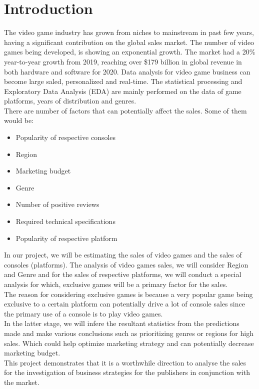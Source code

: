 \documentclass[conference]{IEEEtran}
\begin{document}
\section{Introduction}
The video game industry has grown from niches to mainstream in past few years, having a significant contribution on the global sales market. The number of video games being developed, is showing an exponential growth. The market had a 20\% year-to-year growth from 2019, reaching over \$179 billion in global revenue in both hardware and software for 2020\cite{b1}.  Data analysis for video game business can become large saled, personalized and real-time. The
statistical processing and Exploratory Data Analysis (EDA) are mainly performed on the data of game platforms, years of distribution and genres.\\
There are number of factors that can potentially affect the sales. Some of them would be:
\begin{itemize}
    \item Popularity of respective consoles
    \item Region
    \item Marketing budget
    \item Genre
    \item Number of positive reviews
    \item Required technical specifications
    \item Popularity of respective platform
\end{itemize}
In our project, we will be estimating the sales of video games and the sales of consoles (platforms). The analysis of video games sales, we will consider Region and Genre and for the sales of respective platforms, we will conduct a special analysis for which, exclusive games will be a primary factor for the sales.\\ The reason for considering exclusive games is because a very popular game being exclusive to a certain platform can potentially drive a lot of console sales since the primary use of a console is to play video games.\\
In the latter stage, we will infere the resultant statistics from the predictions made and make various conclusions such as prioritizing genres or regions for high sales. Which could help optimize marketing strategy and can potentially decrease marketing budget.\\
This project demonstrates that it is a worthwhile direction to analyse the sales for the investigation of business strategies for the publishers in conjunction with the market.
\end{document}
